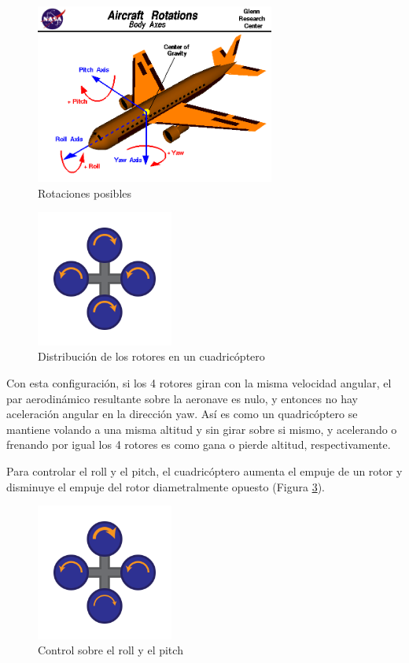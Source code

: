 \documentclass[12pt,twoside]{article}
\begin{document}
		\begin{figure}
			\centering
			\includegraphics[width=0.7\textwidth]{Imatges/Funcionament/rotations.png}
			\caption{Rotaciones posibles}
			\label{fig:rotations}
		\end{figure}
		
		\begin{figure}
			\centering
			\includegraphics[width=0.4\textwidth]{Imatges/Funcionament/quadrotorhover.png}
			\caption{Distribución de los rotores en un cuadricóptero}
			\label{fig:quadrotorhover}
		\end{figure}
		
		Con esta configuración, si los 4 rotores giran con la misma velocidad angular, el par aerodinámico resultante sobre la aeronave es nulo, y entonces no hay aceleración angular en la dirección yaw. Así es como un quadricóptero se mantiene volando a una misma altitud y sin girar sobre si mismo, y acelerando o frenando por igual los 4 rotores es como gana o pierde altitud, respectivamente. 
		
		Para controlar el roll y el pitch, el cuadricóptero aumenta el empuje de un rotor y disminuye el empuje del rotor diametralmente opuesto (Figura \ref{fig:quadrotorpitch_androll}).
		
		\begin{figure}
			\centering
			\includegraphics[width=0.4\textwidth]{Imatges/Funcionament/quadrotorpitch_androll.png}
			\caption{Control sobre el roll y el pitch}
			\label{fig:quadrotorpitch_androll}
		\end{figure}
		
\end{document}
